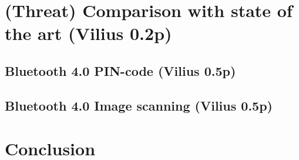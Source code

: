 \documentclass[12pt]{article}
\begin{document}
\newpage

\section{(Threat) Comparison with state of the art (Vilius 0.2p)}
\label{sec:Comparison with state of the art}

\subsection{Bluetooth 4.0 PIN-code (Vilius 0.5p)}
\label{sub:Bluetooth 4.0 PIN-code}

\subsection{Bluetooth 4.0 Image scanning (Vilius 0.5p)}
\label{sub:Bluetooth 4.0 Image scanning}

\newpage

\section{Conclusion}
\label{sec:Conclusion}

\newpage


\nocite{*}

\end{document}
